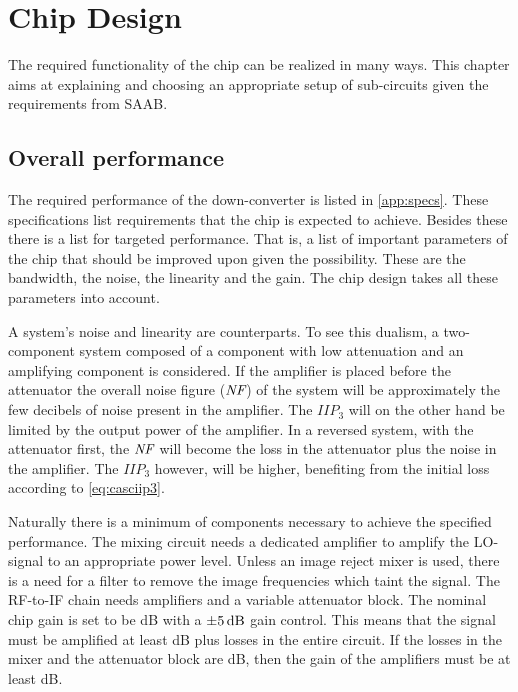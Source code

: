 \chapter{Chip Design}\label{chap:sysdes}

	The required functionality of the chip can be realized in many ways. This chapter aims at explaining and choosing an appropriate setup of sub-circuits given the requirements from SAAB.

	\section{Overall performance}
		The required performance of the down-converter is listed in \autoref{app:specs}. These specifications list requirements that the chip is expected to achieve. Besides these there is a list for targeted performance. That is, a list of important parameters of the chip that should be improved upon given the possibility. These are the bandwidth, the noise, the linearity and the gain. The chip design takes all these parameters into account.

		A system's noise and linearity are counterparts. To see this dualism, a two-component system composed of a component with low attenuation and an amplifying component is considered. If the amplifier is placed before the attenuator the overall noise figure ($\emph{NF}$) of the system will be approximately the few decibels of noise present in the amplifier. The $IIP_3$ will on the other hand be limited by the output power of the amplifier. In a reversed system, with the attenuator first, the $\emph{NF}$ will become the loss in the attenuator plus the noise in the amplifier. The $IIP_3$ however, will be higher, benefiting from the initial loss according to \autoref{eq:casciip3}.

		Naturally there is a minimum of components necessary to achieve the specified performance. The mixing circuit needs a dedicated amplifier to amplify the LO-signal to an appropriate power level. Unless an image reject mixer is used, there is a need for a filter to remove the image frequencies which taint the signal. The RF-to-IF chain needs amplifiers and a variable attenuator block. The nominal chip gain is set to be \unit[8--10]{dB} with a $\unit[\pm 5]{dB}$ gain control. This means that the signal must be amplified at least \unit[13]{dB} plus losses in the entire circuit. If the losses in the mixer and the attenuator block are \unit[10]{dB}, then the gain of the amplifiers must be at least \unit[23]{dB}.

